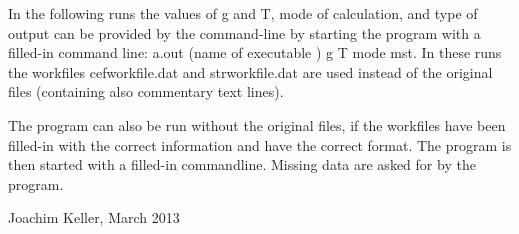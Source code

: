 In the following runs  the values of g and T, mode of calculation, and type
of output can be  provided by the
command-line by starting the program with a filled-in command line: 
 a.out (name of executable ) 
g T mode mst. In these runs the workfiles cefworkfile.dat and
strworkfile.dat are used instead of the original files (containing
also commentary text lines). 

The program can also be run without the original
files, if the workfiles have been filled-in with the correct information and
have the correct
format. The program is then started with a filled-in commandline. Missing
data are asked for by the program.     


Joachim Keller, March 2013 

%
\newpage

